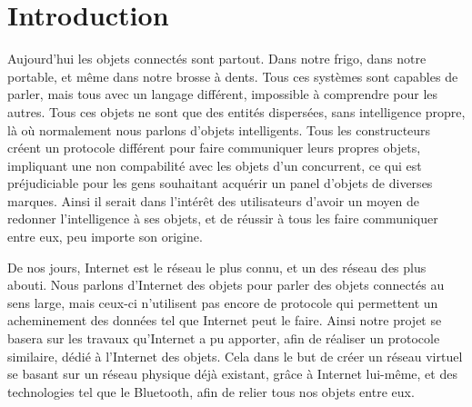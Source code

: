 \chapter*{Introduction}

Aujourd'hui les objets connectés sont partout. Dans notre frigo, dans notre portable, et même dans notre 
brosse à dents. Tous ces systèmes sont capables de parler, mais tous avec un langage différent, impossible à 
comprendre pour les autres. Tous ces objets ne sont que des entités dispersées, sans intelligence propre, là 
où normalement nous parlons d'objets intelligents. Tous les constructeurs créent un protocole différent pour 
faire communiquer leurs propres objets, impliquant une non compabilité avec les objets d'un concurrent, ce qui 
est préjudiciable pour les gens souhaitant acquérir un panel d'objets de diverses marques. Ainsi il serait 
dans l'intérêt des utilisateurs d'avoir un moyen de redonner l'intelligence à ses objets, et de réussir à tous 
les faire communiquer entre eux, peu importe son origine.

De nos jours, Internet est le réseau le plus connu, et un des réseau des plus abouti. Nous parlons d'Internet 
des objets pour parler des objets connectés au sens large, mais ceux-ci n'utilisent pas encore de protocole 
qui permettent un acheminement des données tel que Internet peut le faire. Ainsi notre projet se basera sur 
les travaux qu'Internet a pu apporter, afin de réaliser un protocole similaire, dédié à l'Internet des 
objets. Cela dans le but de créer un réseau virtuel se basant sur un réseau physique déjà existant, grâce à 
Internet lui-même, et des technologies tel que le Bluetooth, afin de relier tous nos objets entre eux.